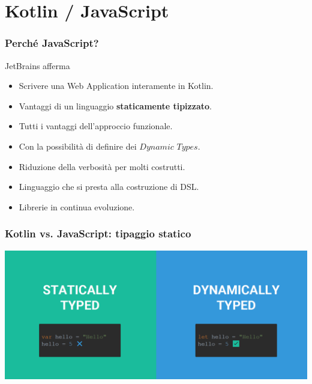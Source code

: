     \section{Kotlin / JavaScript}
    \begin{frame}
      \frametitle{Perché JavaScript?}
      \begin{block}{JetBrains afferma}
        \begin{itemize}[<+->]
          \item Scrivere una Web Application interamente in Kotlin.
          \medskip
          \item Vantaggi di un linguaggio \textbf{staticamente tipizzato}.
          \medskip
          \item Tutti i vantaggi dell'approccio funzionale.
          \medskip
          \item Con la possibilità di definire dei $Dynamic$ $Types$.
          \medskip
          \item Riduzione della verbosità per molti costrutti.
          \medskip
          \item Linguaggio che si presta alla costruzione di DSL.
          \medskip
          \item Librerie in continua evoluzione.
          \medskip
        \end{itemize}
      \end{block}
    \end{frame}

    \begin{frame}
      \frametitle{Kotlin vs. JavaScript: tipaggio statico}
      \begin{center}
        \includegraphics[scale=0.33]{StatVSDinPNG}
      \end{center}
    \end{frame}

